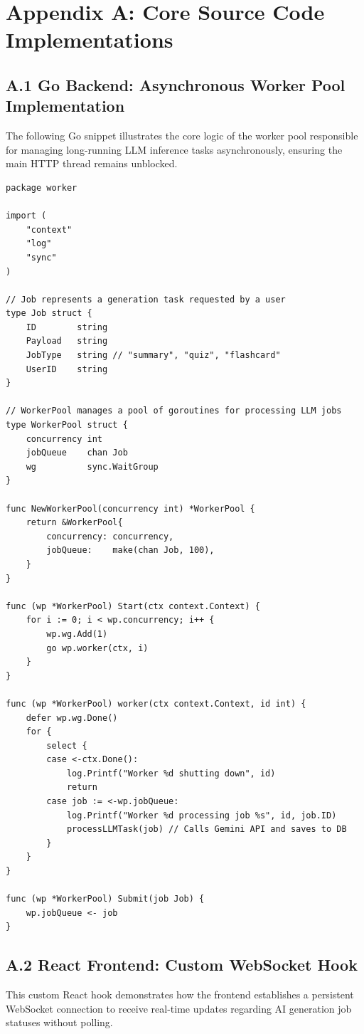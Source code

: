 \chapter{Appendix A: Core Source Code Implementations}

\section*{A.1 Go Backend: Asynchronous Worker Pool Implementation}
The following Go snippet illustrates the core logic of the worker pool responsible for managing long-running LLM inference tasks asynchronously, ensuring the main HTTP thread remains unblocked.

\begin{lstlisting}[caption=Worker Pool implementation in Go]
package worker

import (
	"context"
	"log"
	"sync"
)

// Job represents a generation task requested by a user
type Job struct {
	ID        string
	Payload   string
	JobType   string // "summary", "quiz", "flashcard"
	UserID    string
}

// WorkerPool manages a pool of goroutines for processing LLM jobs
type WorkerPool struct {
	concurrency int
	jobQueue    chan Job
	wg          sync.WaitGroup
}

func NewWorkerPool(concurrency int) *WorkerPool {
	return &WorkerPool{
		concurrency: concurrency,
		jobQueue:    make(chan Job, 100),
	}
}

func (wp *WorkerPool) Start(ctx context.Context) {
	for i := 0; i < wp.concurrency; i++ {
		wp.wg.Add(1)
		go wp.worker(ctx, i)
	}
}

func (wp *WorkerPool) worker(ctx context.Context, id int) {
	defer wp.wg.Done()
	for {
		select {
		case <-ctx.Done():
			log.Printf("Worker %d shutting down", id)
			return
		case job := <-wp.jobQueue:
			log.Printf("Worker %d processing job %s", id, job.ID)
			processLLMTask(job) // Calls Gemini API and saves to DB
		}
	}
}

func (wp *WorkerPool) Submit(job Job) {
	wp.jobQueue <- job
}
\end{lstlisting}

\section*{A.2 React Frontend: Custom WebSocket Hook}
This custom React hook demonstrates how the frontend establishes a persistent WebSocket connection to receive real-time updates regarding AI generation job statuses without polling.

